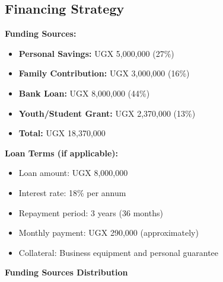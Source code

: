 \subsection{Financing Strategy}

\textbf{Funding Sources:}
\begin{itemize}[leftmargin=2em]
    \item \textbf{Personal Savings:} UGX 5,000,000 (27\%)
    \item \textbf{Family Contribution:} UGX 3,000,000 (16\%)
    \item \textbf{Bank Loan:} UGX 8,000,000 (44\%)
    \item \textbf{Youth/Student Grant:} UGX 2,370,000 (13\%)
    \item \textbf{Total:} UGX 18,370,000
\end{itemize}

\textbf{Loan Terms (if applicable):}
\begin{itemize}[leftmargin=2em]
    \item Loan amount: UGX 8,000,000
    \item Interest rate: 18\% per annum
    \item Repayment period: 3 years (36 months)
    \item Monthly payment: UGX 290,000 (approximately)
    \item Collateral: Business equipment and personal guarantee
\end{itemize}

\vspace{1em}

\begin{center}
\textbf{Funding Sources Distribution}
\vspace{0.5em}

\end{center}

\vspace{1em}

